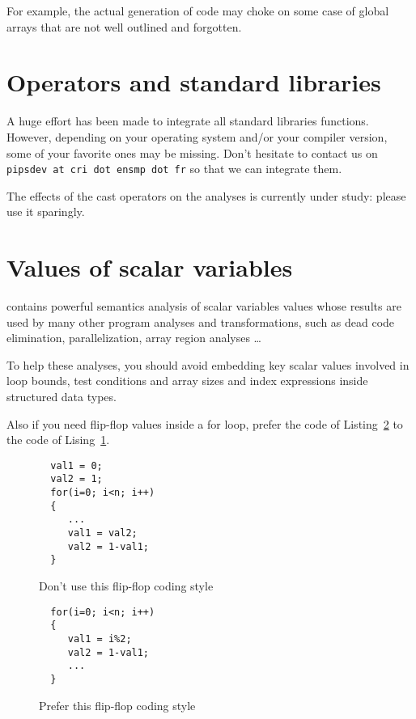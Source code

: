 \documentclass[a4paper]{article}
\begin{document}
For example, the actual generation of \Agpu code may choke on some case of
global arrays that are not well outlined and forgotten.


\section{Operators and standard libraries}
\label{sec:operators_and_standard_libraries}

A huge effort has been made to integrate all standard libraries
functions. However, depending on your operating system and/or your
compiler version, some of your favorite ones may be missing. Don't
hesitate to contact us on \texttt{pipsdev at cri dot ensmp dot fr} so
that we can integrate them.

The effects of the cast operators on the analyses is currently under
study: please use it sparingly.

\section{Values of scalar variables}
\label{sec:values_of_scalar_variables}

\Apips contains powerful semantics analysis of scalar variables values
whose results are used by many other program analyses and
transformations, such as dead code elimination, parallelization,
array region analyses \ldots

To help these analyses, you should avoid embedding key scalar values
involved in loop bounds, test conditions and array sizes and index
expressions inside structured data types.

Also if you need flip-flop values inside a for loop, prefer the code
of Listing~\ref{fig:good_flip_flop} to the code of
Lising~\ref{fig:bad_flip_flop}.

  \begin{figure}
    \begin{lstlisting}
  val1 = 0;
  val2 = 1;
  for(i=0; i<n; i++)
  {
     ...
     val1 = val2;
     val2 = 1-val1;
  }
    \end{lstlisting}
    \caption{Don't use this flip-flop coding style}
    \label{fig:bad_flip_flop}
  \end{figure}
  \begin{figure}
    \begin{lstlisting}
  for(i=0; i<n; i++)
  {
     val1 = i%2;
     val2 = 1-val1;
     ...
  }
    \end{lstlisting}
    \caption{Prefer this flip-flop coding style}
    \label{fig:good_flip_flop}
  \end{figure}
\end{document}
